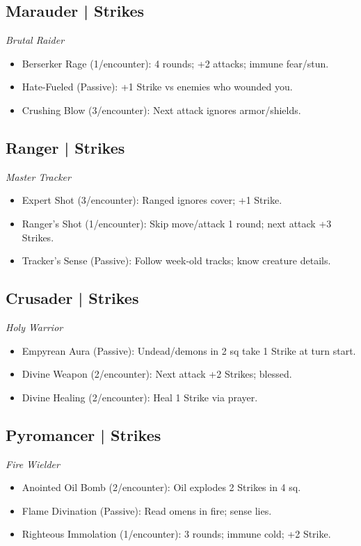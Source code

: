 \documentclass[10pt,twoside]{article}
\begin{document}
\begin{multicols}{2}
\subsection{Marauder \;| Strikes}
\textit{Brutal Raider}
\begin{itemize}
\item Berserker Rage (1/encounter): 4 rounds; +2 attacks; immune fear/stun.
\item Hate-Fueled (Passive): +1 Strike vs enemies who wounded you.
\item Crushing Blow (3/encounter): Next attack ignores armor/shields.
\end{itemize}

\vspace{5mm}

\subsection{Ranger \;| Strikes}
\textit{Master Tracker}
\begin{itemize}
\item Expert Shot (3/encounter): Ranged ignores cover; +1 Strike.
\item Ranger's Shot (1/encounter): Skip move/attack 1 round; next attack +3 Strikes.
\item Tracker's Sense (Passive): Follow week-old tracks; know creature details.
\end{itemize}

\subsection{Crusader \;| Strikes}
\textit{Holy Warrior}
\begin{itemize}
\item Empyrean Aura (Passive): Undead/demons in 2 sq take 1 Strike at turn start.
\item Divine Weapon (2/encounter): Next attack +2 Strikes; blessed.
\item Divine Healing (2/encounter): Heal 1 Strike via prayer.
\end{itemize}

\subsection{Pyromancer \;| Strikes}
\textit{Fire Wielder}
\begin{itemize}
\item Anointed Oil Bomb (2/encounter): Oil explodes 2 Strikes in 4 sq.
\item Flame Divination (Passive): Read omens in fire; sense lies.
\item Righteous Immolation (1/encounter): 3 rounds; immune cold; +2 Strike.
\end{itemize}

\end{multicols}
\end{document}
